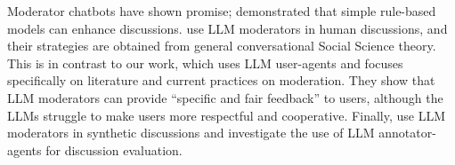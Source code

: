 Moderator chatbots have shown promise; \citet{kim_et_al_chatbot} demonstrated that simple rule-based models can enhance discussions. \citet{cho-etal-2024-language} use \ac{LLM} moderators in human discussions, and their strategies are obtained from general conversational Social Science theory. This is in contrast to our work, which uses \ac{LLM} user-agents and focuses specifically on literature and current practices on moderation. They show that \ac{LLM} moderators can provide “specific and fair feedback” to users, although the \acp{LLM} struggle to make users more respectful and cooperative. Finally, \citet{dtsirmpas_thesis} use \ac{LLM} moderators in synthetic discussions and investigate the use of \ac{LLM} annotator-agents for discussion evaluation.